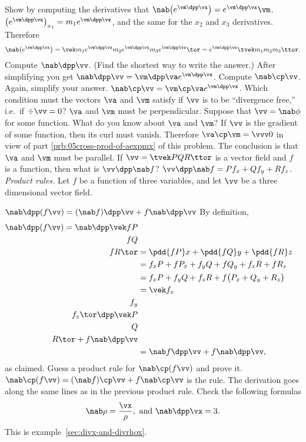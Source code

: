 \begin{multicols}{2}
\subprob Show by computing the derivatives 
that $\nab \bigl(e^{\vm\dpp\vx}\bigr) = e^{\vm\dpp\vx} \vm$.
\answer
$\bigl(e^{\vm\dpp\vx}\bigr)_{x_1} = m_1e^{\vm\dpp\vx}$, and the same for the $x_2$
and $x_3$ derivatives.   Therefore
\[
\nab\bigl(e^{\vm\dpp\vx}\bigr) =
\vek m_1e^{\vm\dpp\vx}\\m_2e^{\vm\dpp\vx} \\ m_3e^{\vm\dpp\vx} \tor
=e^{\vm\dpp\vx} \tvek m_1\\m_2\\m_3\ttor.
\]
\endanswer
\subprob Compute $\nab\dpp \vv$.   (Find the shortest way to write 
the answer.)
\answer
After simplifying you get $\nab\dpp\vv = \vm\dpp\va e^{\vm\dpp\vx}$.
\endanswer
\subprob Compute $\nab\cp\vv$.\label{prb:05cross-prod-of-aexpmx} 
Again, simplify your answer.
\answer
$\nab\cp\vv = \vm\cp\va e^{\vm\dpp\vx}$.
\endanswer
\subprob Which condition must the vectors $\va$ and $\vm$ satisfy if  
$\vv$ is to be ``divergence free,'' i.e.\ if $\div \vv = 0$?
\answer
$\va$ and $\vm$ must be perpendicular.
\endanswer
\subprob Suppose that $\vv = \nab \phi$ for some function.  
What do you know about $\va$ and $\vm$?
\answer
If $\vv$ is the gradient of some function, then its curl must vanish.
Therefore $\va\cp\vm=\vvv0$ in view of part \ref{prb:05cross-prod-of-aexpmx}
of this problem.   The conclusion is that $\va$ and $\vm$ must
be parallel.
\endanswer
\problem If $\vv=\tvek P\\ Q \\ R\ttor$ is a vector field and $f$ is 
a function, then what is $\vv\dpp\nab f$?
\answer
$\vv\dpp\nab f = P f_x + Q f_y + R f_z$.
\endanswer
\problem \emph{Product rules.  }\label{prb:05product-rule} 
Let $f$ be a function of three variables, and let $\vv$ be a three
dimensional vector field.

\subprob $\nab\dpp(f\vv) = (\nab f)\dpp\vv + f \nab\dpp\vv$ 
\answer
By definition,
\begin{align*}
  \nab\dpp(f\vv) = \nab \dpp \vek fP\\fQ \\fR\tor
  &= \pdd{fP}x + \pdd{fQ}y + \pdd{fR}z  \\
  &= f_x P + fP_x + f_yQ + fQ_y + f_z R + fR_z\\
  &= f_x P +f_y Q + f_z R + f\bigl(P_x+Q_y+R_z\bigr) \\
  &= \vek f_x\\ f_y\\ f_z\tor \dpp \vek P\\Q\\R\tor + f \nab\dpp\vv \\
  &= \nab f\dpp \vv + f\nab \dpp\vv,
\end{align*}
as claimed.
\endanswer
\subprob Guess a product rule for $\nab\cp(f\vv)$ and prove it.  
\answer
$\nab\cp(f\vv) = (\nab f)\cp\vv + f\nab\cp\vv$ is the rule.
The derivation goes along the same lines as in the previous product rule.
\endanswer
\problem \label{prb:gradrho-and-divx} Check the following 
formulas
\[
\nab \rho = \frac{\vx} {\rho}, \text{ and }
\nab\dpp \vx = 3.
\]
\answer
This is example~\ref{sec:divx-and-divrhox}.
\endanswer


\end{multicols}
